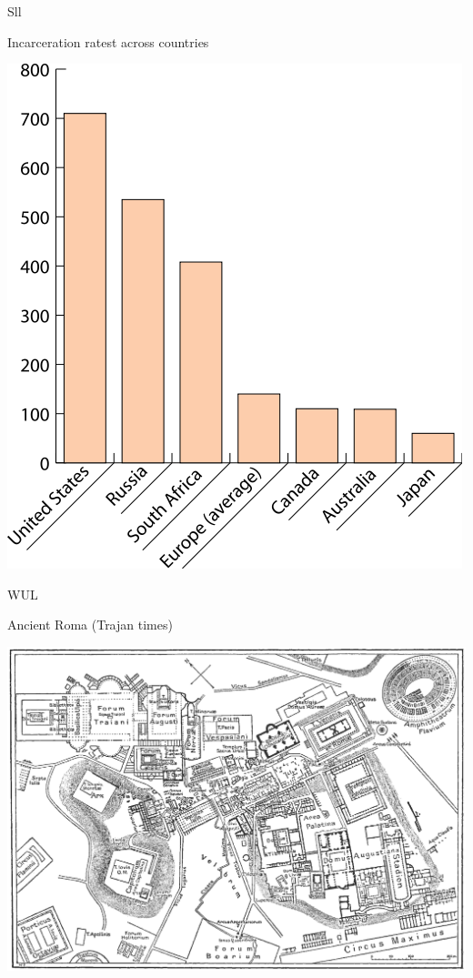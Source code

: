 \begin{map}{S}{ll}
\caption{Incarceration ratest across countries}
\label{chart:incarceration}
\includegraphics[width=\chartwidth,height=\chartheight]{incarceration}  
\end{map}

\begin{map}{W}{UL}
\caption{Ancient Roma  (Trajan times)}
\label{map:roma}
\includegraphics[width=\chartwidth,height=\chartheight]{Rome}
\end{map}


